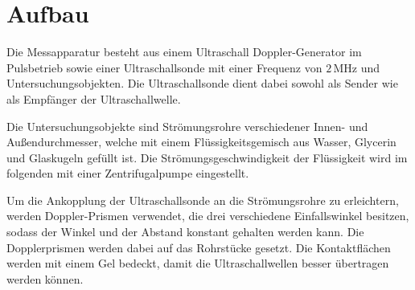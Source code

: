 \section{Aufbau}
\label{sec:Aufbau}

Die Messapparatur besteht aus einem Ultraschall Doppler-Generator im Pulsbetrieb sowie einer Ultraschallsonde mit einer Frequenz von $2\,\unit{\mega\hertz}$
und Untersuchungsobjekten. Die Ultraschallsonde dient dabei sowohl als Sender wie als Empfänger der Ultraschallwelle. 

Die Untersuchungsobjekte sind Strömungsrohre verschiedener Innen- und Außendurchmesser, welche mit einem Flüssigkeitsgemisch aus Wasser, Glycerin und 
Glaskugeln gefüllt ist. Die Strömungsgeschwindigkeit der Flüssigkeit wird im folgenden mit einer Zentrifugalpumpe eingestellt.

Um die Ankopplung der Ultraschallsonde an die Strömungsrohre zu erleichtern, werden Doppler-Prismen verwendet, die drei verschiedene Einfallswinkel besitzen, sodass 
der Winkel und der Abstand konstant gehalten werden kann. Die Dopplerprismen werden dabei auf das Rohrstücke gesetzt. Die Kontaktflächen werden mit einem Gel bedeckt, damit die Ultraschallwellen besser übertragen werden können.
